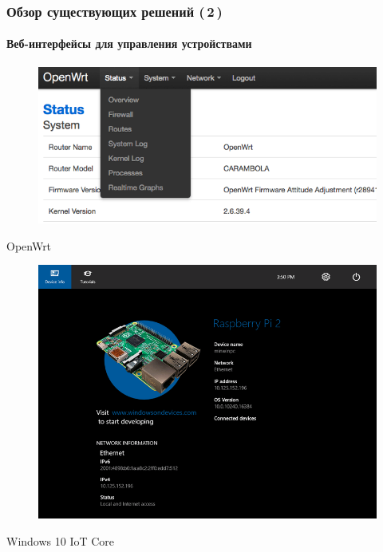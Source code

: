 \documentclass[xetex,с,aspectratio=169]{beamer}
\begin{document}
%
%
\begin{frame}
  \frametitle{Обзор существующих решений (\,2\,)}
  \framesubtitle{Веб-интерфейсы для управления устройствами}
  \vskip 1cm
  \begin{minipage}{\textwidth}
    \centering
    \begin{minipage}[c]{.45\textwidth}
      \centering
      \begin{figure}[h]
        \centering
        \includegraphics[width=\textwidth]{../img/openwrt-menu}
      \end{figure}
      OpenWrt
    \end{minipage}
    \hspace{1em}
    \begin{minipage}[c]{.45\textwidth}
      \centering
      \begin{figure}[h]
        \centering
        \includegraphics[width=\textwidth]{../img/win10-device-info}
      \end{figure}
      Windows 10 IoT Core
    \end{minipage}
  \end{minipage}
\end{frame}
\end{document}
